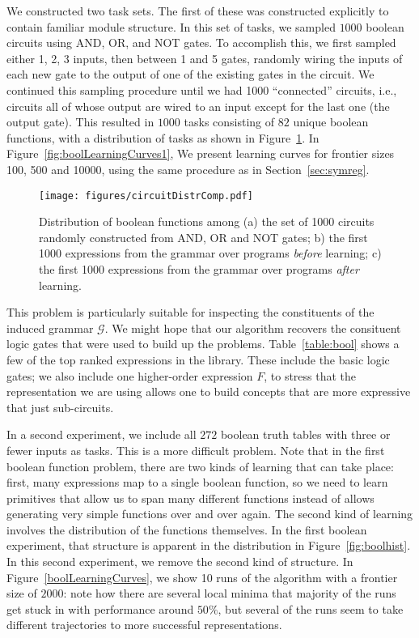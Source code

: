 \documentclass{article}
\begin{document}
We constructed two task sets. The first of these was constructed
explicitly to contain familiar module structure. In this set of tasks,
we sampled $1000$ boolean circuits using AND, OR, and NOT gates. To
accomplish this, we first sampled either 1, 2, 3 inputs, then between
1 and 5 gates, randomly wiring the inputs of each new gate to the
output of one of the existing gates in the circuit. We continued this
sampling procedure until we had 1000 ``connected'' circuits, i.e.,
circuits all of whose output are wired to an input except for the last
one (the output gate). This resulted in $1000$ tasks consisting of
$82$ unique boolean functions, with a distribution of tasks as shown
in Figure~\ref{fig:booldistr}. In Figure~\ref{fig:boolLearningCurves1},
We present learning curves for frontier sizes 100, 500 and 10000,
using the same procedure as in Section~\ref{sec:symreg}. 

\begin{figure}
\texttt{[image: figures/circuitDistrComp.pdf]}
\label{fig:booldistr}
\caption{Distribution of boolean functions among (a) the set of 1000
  circuits randomly constructed from AND, OR and NOT gates; b) the
  first 1000 expressions from the grammar over programs \emph{before}
  learning; c) the first 1000 expressions from the grammar over
  programs \emph{after} learning.}
\end{figure}

This problem is particularly suitable for inspecting the constituents
of the induced grammar $\mathcal{G}$. We might hope that our algorithm
recovers the consituent logic gates that were used to build up the
problems. Table~\ref{table:bool} shows a few of the top ranked
expressions in the library. These include the basic logic gates; we
also include one higher-order expression $F$, to stress that the
representation we are using allows one to build concepts that are more
expressive that just sub-circuits.

In a second experiment, we include all $272$ boolean truth tables with
three or fewer inputs as tasks. This is a more difficult problem. Note
that in the first boolean function problem, there are two kinds of
learning that can take place: first, many expressions map to a single
boolean function, so we need to learn primitives that allow us to span
many different functions instead of allows generating very simple
functions over and over again. The second kind of learning involves
the distribution of the functions themselves. In the first boolean
experiment, that structure is apparent in the distribution in
Figure~\ref{fig:boolhist}. In this second experiment, we remove the
second kind of structure. In Figure~\ref{boolLearningCurves}, we show
10 runs of the algorithm with a frontier size of $2000$: note how
there are several local minima that majority of the runs get stuck in
with performance around $50\%$, but several of the runs seem to take
different trajectories to more successful representations. 
\end{document}
